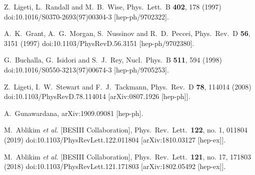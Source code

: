 \begin{thebibliography}{99}
  Z.~Ligeti, L.~Randall and M.~B.~Wise,
  Phys.\ Lett.\ B {\bf 402}, 178 (1997)
  doi:10.1016/S0370-2693(97)00304-3
  [hep-ph/9702322].
  
  A.~K.~Grant, A.~G.~Morgan, S.~Nussinov and R.~D.~Peccei,
  Phys.\ Rev.\ D {\bf 56}, 3151 (1997)
  doi:10.1103/PhysRevD.56.3151
  [hep-ph/9702380].
  
  G.~Buchalla, G.~Isidori and S.~J.~Rey,
  Nucl.\ Phys.\ B {\bf 511}, 594 (1998)
  doi:10.1016/S0550-3213(97)00674-3
  [hep-ph/9705253].
  
  Z.~Ligeti, I.~W.~Stewart and F.~J.~Tackmann,
  Phys.\ Rev.\ D {\bf 78}, 114014 (2008)
  doi:10.1103/PhysRevD.78.114014
  [arXiv:0807.1926 [hep-ph]].

  A.~Gunawardana,
  arXiv:1909.09081 [hep-ph].   
  

  M.~Ablikim {\it et al.} [BESIII Collaboration],
  Phys.\ Rev.\ Lett.\  {\bf 122}, no. 1, 011804 (2019)
  doi:10.1103/PhysRevLett.122.011804
  [arXiv:1810.03127 [hep-ex]].
  
  M.~Ablikim {\it et al.} [BESIII Collaboration],
  Phys.\ Rev.\ Lett.\  {\bf 121}, no. 17, 171803 (2018)
  doi:10.1103/PhysRevLett.121.171803
  [arXiv:1802.05492 [hep-ex]].
  

\end{thebibliography}
